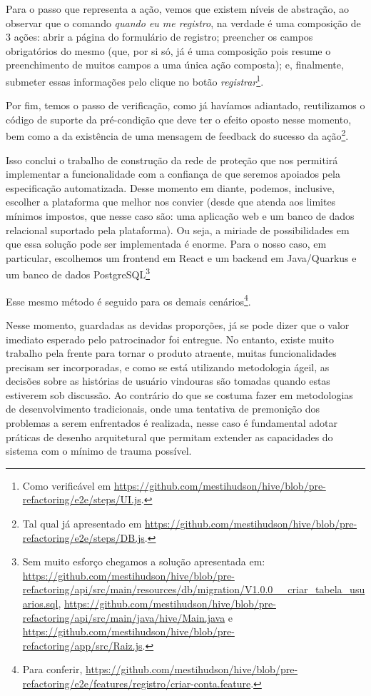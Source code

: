   Para o passo que representa a ação, vemos que existem níveis de abstração, ao observar que o comando \emph{quando eu me registro}, na verdade é uma composição de 3 ações: abrir a página do formulário de registro; preencher os campos obrigatórios do mesmo (que, por si só, já é uma composição pois resume o preenchimento de muitos campos a uma única ação composta); e, finalmente, submeter essas informações pelo clique no botão \emph{registrar}\footnote{Como verificável em \url{https://github.com/mestihudson/hive/blob/pre-refactoring/e2e/steps/UI.js}.}.

  Por fim, temos o passo de verificação, como já havíamos adiantado, reutilizamos o código de suporte da pré-condição que deve ter o efeito oposto nesse momento, bem como a da existência de uma mensagem de feedback do sucesso da ação\footnote{Tal qual já apresentado em \url{https://github.com/mestihudson/hive/blob/pre-refactoring/e2e/steps/DB.js}.}.

  Isso conclui o trabalho de construção da rede de proteção que nos permitirá implementar a funcionalidade com a confiança de que seremos apoiados pela especificação automatizada. Desse momento em diante, podemos, inclusive, escolher a plataforma que melhor nos convier (desde que atenda aos limites mínimos impostos, que nesse caso são: uma aplicação web e um banco de dados relacional suportado pela plataforma). Ou seja, a miriade de possibilidades em que essa solução pode ser implementada é enorme. Para o nosso caso, em particular, escolhemos um frontend em React e um backend em Java/Quarkus e um banco de dados PostgreSQL\footnote{Sem muito esforço chegamos a solução apresentada em: \url{https://github.com/mestihudson/hive/blob/pre-refactoring/api/src/main/resources/db/migration/V1.0.0__criar_tabela_usuarios.sql}, \url{https://github.com/mestihudson/hive/blob/pre-refactoring/api/src/main/java/hive/Main.java} e \url{https://github.com/mestihudson/hive/blob/pre-refactoring/app/src/Raiz.js}.}

  Esse mesmo método é seguido para os demais cenários\footnote{Para conferir, \url{https://github.com/mestihudson/hive/blob/pre-refactoring/e2e/features/registro/criar-conta.feature}.}.

  Nesse momento, guardadas as devidas proporções, já se pode dizer que o valor imediato esperado pelo patrocinador foi entregue. No entanto, existe muito trabalho pela frente para tornar o produto atraente, muitas funcionalidades precisam ser incorporadas, e como se está utilizando metodologia ágeil, as decisões sobre as histórias de usuário vindouras são tomadas quando estas estiverem sob discussão. Ao contrário do que se costuma fazer em metodologias de desenvolvimento tradicionais, onde uma tentativa de premonição dos problemas a serem enfrentados é realizada, nesse caso é fundamental adotar práticas de desenho arquitetural que permitam extender as capacidades do sistema com o mínimo de trauma possível.

